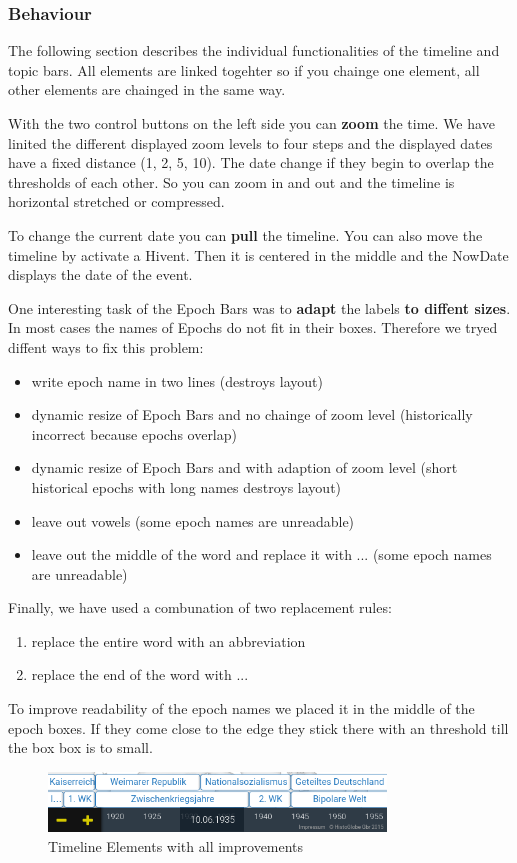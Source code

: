 \subsubsection{Behaviour}
The following section describes the individual functionalities of the timeline and topic bars. All elements are linked togehter so if you chainge one element, all other elements are chainged in the same way.

With the two control buttons on the left side you can \textbf{zoom} the time. We have linited the different displayed zoom levels to four steps and the displayed dates have a fixed distance (1, 2, 5, 10). The date change if they begin to overlap the thresholds of each other. So you can zoom in and out and the timeline is horizontal stretched or compressed.

To change the current date you can \textbf{pull} the timeline. You can also move the timeline by activate a Hivent. Then it is centered in the middle and the NowDate displays the date of the event.

One interesting task of the Epoch Bars was to \textbf{adapt} the labels \textbf{to diffent sizes}. In most cases the names of Epochs do not fit in their boxes. Therefore we tryed diffent ways to fix this problem:

\begin{itemize}
	\item write epoch name in two lines (destroys layout)
	\item dynamic resize of Epoch Bars and no chainge of zoom level (historically incorrect because epochs overlap)
	\item dynamic resize of Epoch Bars and with adaption of zoom level (short historical epochs with long names destroys layout)
	\item leave out vowels (some epoch names are unreadable)
	\item leave out the middle of the word and replace it with ... (some epoch names are unreadable)
\end{itemize}

Finally, we have used a combunation of two replacement rules:

\begin{enumerate}
	\item replace the entire word with an abbreviation
	\item replace the end of the word with ...
\end{enumerate}

To improve readability of the epoch names we placed it in the middle of the epoch boxes. If they come close to the edge they stick there with an threshold till the box box is to small.

\begin{figure}[H]
	\centering
	\includegraphics[width=0.8\textwidth]{graphics/timeline_elements2.png}
	\caption{Timeline Elements with all improvements}
	\label{fig:Timeline_Elements2}
\end{figure}

